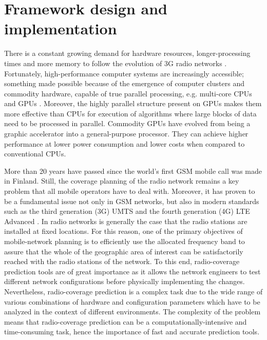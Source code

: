 
\chapter{Framework design and implementation \label{chap:Framework-design-and-implementation}}


\noindent There is a constant growing demand for hardware resources,
longer-processing times and more memory to follow the evolution of
3G radio networks \cite{maple2004parallel,crainic2006tackling,soldani2007autonomic}.
Fortunately, high-performance computer systems are increasingly accessible;
something made possible because of the emergence of computer clusters
and commodity hardware, capable of true parallel processing, e.g.
multi-core CPUs \cite{gorder2007multicore} and GPUs \cite{wen2011gpu}.
Moreover, the highly parallel structure present on GPUs makes them
more effective than CPUs for execution of algorithms where large blocks
of data need to be processed in parallel. Commodity GPUs have evolved
from being a graphic accelerator into a general-purpose processor.
They can achieve higher performance at lower power consumption and
lower costs when compared to conventional CPUs.

\vspace{3cm}


More than 20 years have passed since the world's first GSM mobile
call was made in Finland. Still, the coverage planning of the radio
network remains a key problem that all mobile operators have to deal
with. Moreover, it has proven to be a fundamental issue not only in
GSM networks, but also in modern standards such as the third generation
(3G) UMTS and the fourth generation (4G) LTE Advanced \cite{Saleh_On_the_coveraga_extension_in_LTE_networks:2010,Shabbir_Comparison_of_radio_propagation_models:2011,Siomina:Minimum.pilot.power.for.service.coverage,Valcarce_Applying.FDTD.to.the.coverage.prediction.of.WiMAX:2009}.
In radio networks is generally the case that the radio stations are
installed at fixed locations. For this reason, one of the primary
objectives of mobile-network planning is to efficiently use the allocated
frequency band to assure that the whole of the geographic area of
interest can be satisfactorily reached with the radio stations of
the network. To this end, radio-coverage prediction tools are of great
importance as it allows the network engineers to test different network
configurations before physically implementing the changes. Nevertheless,
radio-coverage prediction is a complex task due to the wide range
of various combinations of hardware and configuration parameters which
have to be analyzed in the context of different environments. The
complexity of the problem means that radio-coverage prediction can
be a computationally-intensive and time-consuming task, hence the
importance of fast and accurate prediction tools.

